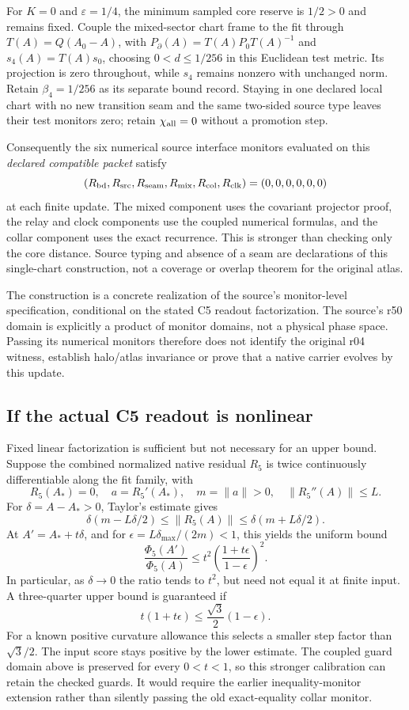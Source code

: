 \documentclass[11pt,a4paper]{article}
\begin{document}
For $K=0$ and $\varepsilon=1/4$, the minimum sampled core reserve is
$1/2>0$ and remains fixed. Couple the mixed-sector chart frame to the
fit through $T(A)=Q(A_0-A)$, with $P_\partial(A)=T(A)P_0T(A)^{-1}$
and $s_4(A)=T(A)s_0$, choosing $0<d\le1/256$ in this Euclidean
test metric. Its projection is zero throughout, while $s_4$
remains nonzero with unchanged norm. Retain $\beta_4=1/256$ as its
separate bound record. Staying in one declared local chart with no new
transition seam and the same two-sided source type leaves their test
monitors zero; retain $\chi_{\rm all}=0$ without a promotion step.

Consequently the six numerical source interface monitors evaluated on
this \emph{declared compatible packet} satisfy
\[
 (R_{\rm bd},R_{\rm src},R_{\rm seam},R_{\rm mix},
   R_{\rm col},R_{\rm clk})=(0,0,0,0,0,0)
\]
at each finite update. The mixed component uses the covariant projector
proof, the relay and clock components use the coupled numerical formulas,
and the collar component uses the exact recurrence. This is stronger than
checking only the core distance. Source typing and absence of a seam are
declarations of this single-chart construction, not a coverage or overlap
theorem for the original atlas.

The construction is a concrete realization of the source's monitor-level
specification, conditional on the stated C5 readout factorization. The
source's r50 domain is explicitly a product of monitor domains, not a
physical phase space. Passing its numerical monitors therefore does not
identify the original r04 witness, establish halo/atlas invariance or
prove that a native carrier evolves by this update.

\subsection{If the actual C5 readout is nonlinear}
Fixed linear factorization is sufficient but not necessary for an upper
bound. Suppose the combined normalized native residual $R_5$ is twice
continuously differentiable along the fit family, with
\[
 R_5(A_*)=0,\quad a=R_5'(A_*),\quad m=\|a\|>0,
 \quad\|R_5''(A)\|\le L.
\]
For $\delta=A-A_*>0$, Taylor's estimate gives
\[
 \delta(m-L\delta/2)\le\|R_5(A)\|
 \le\delta(m+L\delta/2).
\]
At $A'=A_*+t\delta$, and for
$\epsilon=L\delta_{\max}/(2m)<1$, this yields the uniform bound
\[
 \frac{\Phi_5(A')}{\Phi_5(A)}
 \le t^2\left(\frac{1+t\epsilon}{1-\epsilon}\right)^2.
\]
In particular, as $\delta\to0$ the ratio tends to $t^2$, but need not
equal it at finite input. A three-quarter upper bound is guaranteed if
\[
 t(1+t\epsilon)\le\frac{\sqrt3}{2}(1-\epsilon).
\]
For a known positive curvature allowance this selects a smaller step
factor than $\sqrt3/2$. The input score stays positive by the lower
estimate. The coupled guard domain above is preserved for every
$0<t<1$, so this stronger calibration can retain the checked guards.
It would require the earlier inequality-monitor extension rather than
silently passing the old exact-equality collar monitor.
\end{document}
